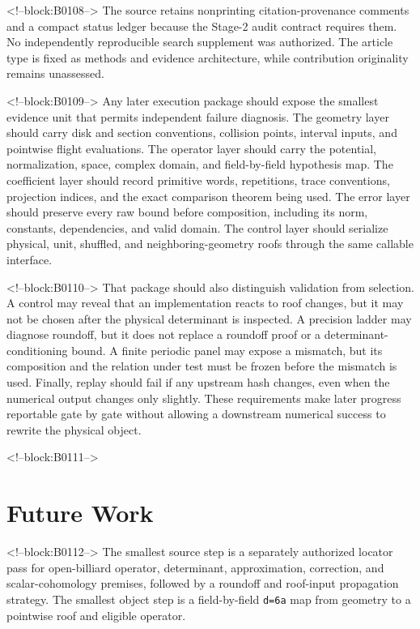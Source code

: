 \documentclass[11pt,a4paper]{article}
\begin{document}
<!--block:B0108-->
The source retains nonprinting citation-provenance comments and a compact status ledger because the Stage-2 audit contract requires them. No independently reproducible search supplement was authorized. The article type is fixed as methods and evidence architecture, while contribution originality remains unassessed.

<!--block:B0109-->
Any later execution package should expose the smallest evidence unit that permits independent failure diagnosis. The geometry layer should carry disk and section conventions, collision points, interval inputs, and pointwise flight evaluations. The operator layer should carry the potential, normalization, space, complex domain, and field-by-field hypothesis map. The coefficient layer should record primitive words, repetitions, trace conventions, projection indices, and the exact comparison theorem being used. The error layer should preserve every raw bound before composition, including its norm, constants, dependencies, and valid domain. The control layer should serialize physical, unit, shuffled, and neighboring-geometry roofs through the same callable interface.

<!--block:B0110-->
That package should also distinguish validation from selection. A control may reveal that an implementation reacts to roof changes, but it may not be chosen after the physical determinant is inspected. A precision ladder may diagnose roundoff, but it does not replace a roundoff proof or a determinant-conditioning bound. A finite periodic panel may expose a mismatch, but its composition and the relation under test must be frozen before the mismatch is used. Finally, replay should fail if any upstream hash changes, even when the numerical output changes only slightly. These requirements make later progress reportable gate by gate without allowing a downstream numerical success to rewrite the physical object.

<!--block:B0111-->
\section{Future Work}

<!--block:B0112-->
The smallest source step is a separately authorized locator pass for open-billiard operator, determinant, approximation, correction, and scalar-cohomology premises, followed by a roundoff and roof-input propagation strategy. The smallest object step is a field-by-field \texttt{d=6a} map from geometry to a pointwise roof and eligible operator.
\end{document}
